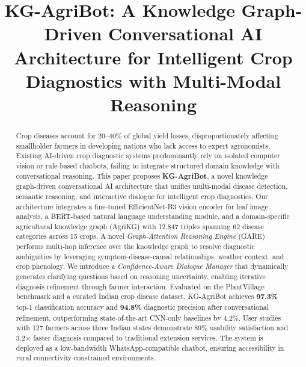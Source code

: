 \documentclass[conference]{IEEEtran}
\begin{document}
\title{KG-AgriBot: A Knowledge Graph-Driven Conversational AI Architecture for Intelligent Crop Diagnostics with Multi-Modal Reasoning}

\author{
}

\maketitle

\begin{abstract}
Crop diseases account for 20--40\% of global yield losses, disproportionately affecting smallholder farmers in developing nations who lack access to expert agronomists. Existing AI-driven crop diagnostic systems predominantly rely on isolated computer vision or rule-based chatbots, failing to integrate structured domain knowledge with conversational reasoning. This paper proposes \textbf{KG-AgriBot}, a novel knowledge graph-driven conversational AI architecture that unifies multi-modal disease detection, semantic reasoning, and interactive dialogue for intelligent crop diagnostics. Our architecture integrates a fine-tuned EfficientNet-B3 vision encoder for leaf image analysis, a BERT-based natural language understanding module, and a domain-specific agricultural knowledge graph (AgriKG) with 12,847 triples spanning 62 disease categories across 15 crops. A novel \textit{Graph-Attention Reasoning Engine} (GARE) performs multi-hop inference over the knowledge graph to resolve diagnostic ambiguities by leveraging symptom-disease-causal relationships, weather context, and crop phenology. We introduce a \textit{Confidence-Aware Dialogue Manager} that dynamically generates clarifying questions based on reasoning uncertainty, enabling iterative diagnosis refinement through farmer interaction. Evaluated on the PlantVillage benchmark and a curated Indian crop disease dataset, KG-AgriBot achieves \textbf{97.3\%} top-1 classification accuracy and \textbf{94.8\%} diagnostic precision after conversational refinement, outperforming state-of-the-art CNN-only baselines by 4.2\%. User studies with 127 farmers across three Indian states demonstrate 89\% usability satisfaction and 3.2$\times$ faster diagnosis compared to traditional extension services. The system is deployed as a low-bandwidth WhatsApp-compatible chatbot, ensuring accessibility in rural connectivity-constrained environments.
\end{abstract}
\end{document}
